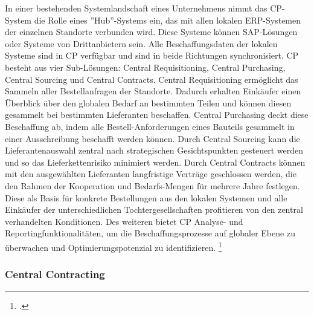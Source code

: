 In einer bestehenden Systemlandschaft eines Unternehmens nimmt das CP-System die Rolle eines ''Hub''-Systems ein, das mit allen lokalen ERP-Systemen der einzelnen Standorte verbunden wird. Diese Systeme können SAP-Lösungen oder Systeme von Drittanbietern sein. Alle Beschaffungsdaten der lokalen Systeme sind in CP verfügbar und sind in beide Richtungen synchronisiert. CP besteht aus vier Sub-Lösungen: Central Requisitioning, Central Purchasing, Central Sourcing und Central Contracts. Central Requisitioning ermöglicht  das Sammeln aller Bestellanfragen der Standorte. Dadurch erhalten Einkäufer einen Überblick über den globalen Bedarf an bestimmten Teilen und können diesen gesammelt bei bestimmten Lieferanten beschaffen. Central Purchasing deckt diese Beschaffung ab, indem alle Bestell-Anforderungen eines Bauteils gesammelt in einer Ausschreibung beschafft werden können. Durch Central Sourcing kann die Lieferantenauswahl zentral nach strategischen Gesichtspunkten gesteuert werden und so das Lieferkettenrisiko minimiert werden. Durch Central Contracts können mit den ausgewählten Lieferanten langfristige Verträge geschlossen werden, die den Rahmen der Kooperation und Bedarfs-Mengen für mehrere Jahre festlegen. Diese als Basis für konkrete Bestellungen aus den lokalen Systemen und alle Einkäufer der unterschiedlichen Tochtergesellschaften profitieren von den zentral verhandelten Konditionen. Des weiteren bietet CP Analyse- und Reportingfunktionalitäten, um die Beschaffungsprozesse auf globaler Ebene zu überwachen und Optimierungspotenzial zu identifizieren. \footcite[Vgl.][]{theorie_sap_central_procurement_overview_2024}

\subsubsection{Central Contracting}


